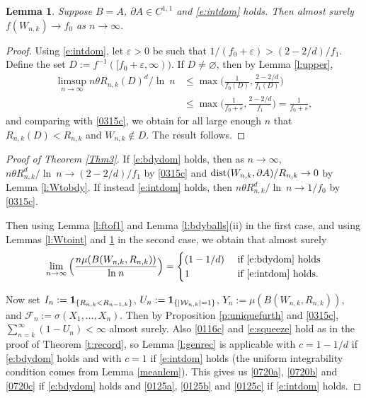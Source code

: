 \documentclass[12pt]{article}
\newcommand{\cW}{\mathcal{W}}
\newcommand{\cF}{\mathcal{F}}
\renewcommand{\emptyset}{\varnothing}
\newcommand{\eps}{\varepsilon}
\newcommand{\dist}{{\rm dist}}
\renewcommand{\log}{{\ln \:}}
\newtheorem{lemm}{Lemma}
\begin{document}
\begin{lemm}
	\label{l:ftof0}
	Suppose $B=A$, $\partial A \in C^{1,1}$
	and \eqref{e:intdom} holds. Then
	almost surely $f(W_{n,k} ) \to f_0$ as $n \to \infty$.
\end{lemm}
\begin{proof}
	Using
	\eqref{e:intdom},
	let $\eps >0$ be  such that  $1/(f_0+ \eps) > (2-2/d)/f_1$.
	Define the set $D := f^{-1}([f_0 + \eps ,\infty))$. 
	If $D \neq \emptyset$, then
	by Lemma \ref{l:upper}, %
	\begin{align*}
	\limsup_{n \to \infty}
		n \theta R_{n,k}(D)^d/\log n & 
		\leq \max \Big( \frac{1}{f_0(D)},\frac{
		2-2/d}{f_1(D)} \Big)
		\\ 
		&\leq \max \Big( \frac{1}{f_0+ \eps},\frac{2-2/d}{f_1} \Big)
		= \frac{1}{f_0 + \eps},
	\end{align*}
%
	and comparing with \eqref{0315c},
	we obtain for all large enough $n$ that $R_{n,k}(D) < R_{n,k}$
	and  $W_{n,k} \notin D$. The result follows.
\end{proof}


\begin{proof}[Proof of Theorem \ref{Thm3}]
	If \eqref{e:bdydom} holds,
	then as $n \to \infty$,
	$n \theta R_{n,k}^d/\log n \to (2-2/d)/f_1$
	by \eqref{0315c}
	and $\dist(W_{n,k}, \partial A)/R_{n,k} \to 0$
	by Lemma \ref{l:Wtobdy}.
	If instead \eqref{e:intdom} holds, then 
	$n \theta R_{n,k}^d/\log n \to 1/f_0$
	by \eqref{0315c}.


	Then using Lemma \ref{l:ftof1} and Lemma
	\ref{l:bdyballs}(ii) in the first case, and using Lemmas \ref{l:Wtoint}
	and \ref{l:ftof0} in the second case,
	we obtain that almost surely
	$$
	\lim_{n \to \infty} \Big( \frac{n \mu(B(W_{n,k},R_{n,k}))}{
		\log n}
	\Big) = \begin{cases}
		(1-1/d) & \mbox{ if } \eqref{e:bdydom} \mbox{ holds} 
		\\
		1  & \mbox{ if } \eqref{e:intdom} \mbox{ holds.}
	\end{cases}
	$$
	
	Now set $I_n := {\bf 1}_{\{R_{n,k} < R_{n-1,k}\}}$, 
	$U_n := {\bf 1}_{\{|\cW_{n,k}|=1\}}$, $Y_n:= \mu(B(W_{n,k},
	R_{n,k}))$, %
	and $\cF_n := \sigma(X_1,\ldots,X_n)$. 
	Then by Proposition \ref{p:uniquefurth}
	and \eqref{0315c}, $\sum_{n=k}^\infty(1-U_n) < \infty $ almost surely.
	Also \eqref{0116c} and  \eqref{e:squeeze} hold as in
	the proof of Theorem \ref{t:record},
	so Lemma \ref{l:genrec} is applicable with $c= 1-1/d$
	if \eqref{e:bdydom} holds and with $c=1$ if \eqref{e:intdom} holds
	(the uniform integrability condition comes from Lemma \ref{meanlem}).
	This gives us \eqref{0720a}, \eqref{0720b} and \eqref{0720c}
	if \eqref{e:bdydom} holds and \eqref{0125a}, \eqref{0125b} and \eqref{0125c}
	if \eqref{e:intdom} holds.
\end{proof}
\end{document}

